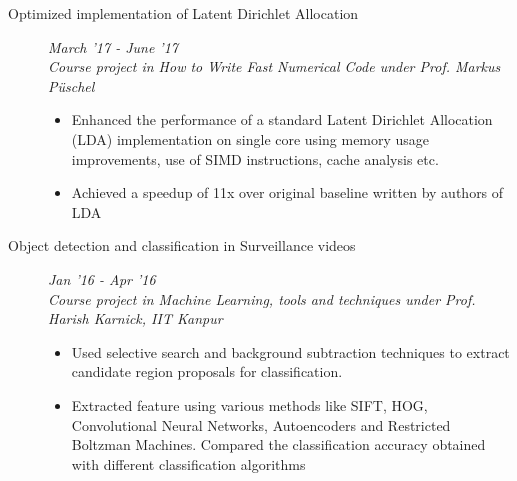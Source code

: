 \documentclass[9pt]{article}
\newenvironment{changemargin}[2]{%
  \begin{list}{}{%
    \setlength{\topsep}{0pt}%
    \setlength{\leftmargin}{#1}%
    \setlength{\rightmargin}{#2}%
    \setlength{\listparindent}{\parindent}%
    \setlength{\itemindent}{\parindent}%
    \setlength{\parsep}{\parskip}%
  }%
  \item[]}{\end{list}
}
\newenvironment{body} {
	\vspace*{-16pt}
	\begin{changemargin}{-0.6in}{-0.65in}
  }	
	{\end{changemargin}
}
\begin{document}
\begin{body}
\begin{description}
	\item[\normalsize{Optimized implementation of Latent Dirichlet Allocation}]
	\hfill \textit{March '17 - June '17} \\
	\textit{Course project in How to Write Fast Numerical Code under Prof. Markus P{\"u}schel}
	\begin{itemize}
		\item Enhanced the performance of a standard Latent Dirichlet Allocation (LDA)
		implementation on single core using memory usage improvements, use of SIMD instructions, cache analysis etc.
		\item Achieved a speedup of 11x over original baseline written by authors of LDA
	\end{itemize}
      
	 \item[\normalsize{Object detection and classification in Surveillance videos}] \hfill  \textit{Jan '16 - Apr '16} \\
	  \textit{Course project in Machine Learning, tools and techniques under Prof. Harish Karnick, IIT Kanpur}
	  \begin{itemize}
            \item Used selective search and background subtraction techniques to extract candidate region proposals for classification. 
            \item Extracted feature using various methods like SIFT, HOG, Convolutional Neural Networks, Autoencoders and Restricted Boltzman Machines. Compared the classification accuracy obtained with different classification algorithms
	  \end{itemize}



\end{description}
\end{body}
\end{document}
